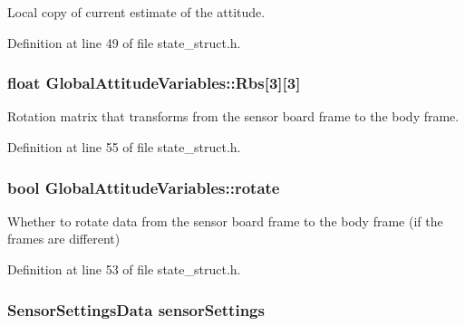 \-Local copy of current estimate of the attitude. 



\-Definition at line 49 of file state\-\_\-struct.\-h.

\hypertarget{group___state_estimation_filters_ga6c34048525801ac0e7e26eb733c759d5}{
\subsubsection[{\-Rbs}]{\setlength{\rightskip}{0pt plus 5cm}float {\bf \-Global\-Attitude\-Variables\-::\-Rbs}\mbox{[}3\mbox{]}\mbox{[}3\mbox{]}}}\label{group___state_estimation_filters_ga6c34048525801ac0e7e26eb733c759d5}


\-Rotation matrix that transforms from the sensor board frame to the body frame. 



\-Definition at line 55 of file state\-\_\-struct.\-h.

\hypertarget{group___state_estimation_filters_gad5da7bf77c18e9d5990d4b6d6f28477e}{
\subsubsection[{rotate}]{\setlength{\rightskip}{0pt plus 5cm}bool {\bf \-Global\-Attitude\-Variables\-::rotate}}}\label{group___state_estimation_filters_gad5da7bf77c18e9d5990d4b6d6f28477e}


\-Whether to rotate data from the sensor board frame to the body frame (if the frames are different) 



\-Definition at line 53 of file state\-\_\-struct.\-h.

\hypertarget{group___state_estimation_filters_ga7e2b26cdc0322ab9457559aa2b94f8fc}{
\subsubsection[{sensor\-Settings}]{\setlength{\rightskip}{0pt plus 5cm}\-Sensor\-Settings\-Data {\bf sensor\-Settings}}}\label{group___state_estimation_filters_ga7e2b26cdc0322ab9457559aa2b94f8fc}


